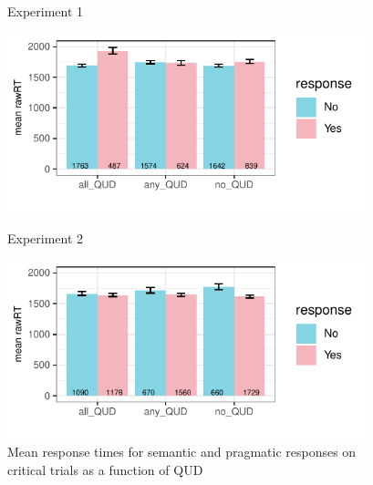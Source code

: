 \documentclass[12pt]{article}
\begin{document}
\begin{figure}[!ht] 
    \begin{minipage}{.5\textwidth}
        \caption*{Experiment 1}
        \includegraphics[height=5.2cm]{img/exp1_response_time.pdf}
    \end{minipage}%
    \begin{minipage}{.5\textwidth}
        \caption*{Experiment 2}
        \includegraphics[height=5.2cm]{img/exp2_response_time.pdf}
    \end{minipage}%
    \caption{Mean response times for semantic and pragmatic responses on critical trials as a function of QUD}
\end{figure}
\end{document}
